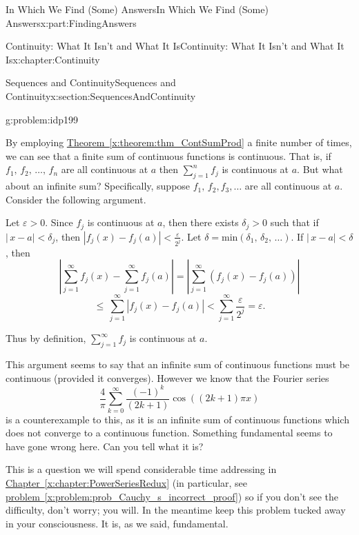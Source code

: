 \documentclass[oneside,10pt,]{book}
\newcommand{\xreffont}{\relax}
\numberwithin{equation}{section}
\newcommand{\eps}{\varepsilon}
\newcommand{\lt}{<}
\begin{document}
\begin{partptx}{In Which We Find (Some) Answers}{}{In Which We Find (Some) Answers}{}{}{x:part:FindingAnswers}
\begin{chapterptx}{Continuity: What It Isn't and What It Is}{}{Continuity: What It Isn't and What It Is}{}{}{x:chapter:Continuity}
\begin{sectionptx}{Sequences and Continuity}{}{Sequences and Continuity}{}{}{x:section:SequencesAndContinuity}
\begin{problem}{}{g:problem:idp199}
\end{problem}
By employing \hyperref[x:theorem:thm_ContSumProd]{Theorem~{\xreffont\ref{x:theorem:thm_ContSumProd}}} a finite number of times, we can see that a finite sum of continuous functions is continuous. That is, if \(f_1,\,f_2,\,\ldots,\,f_n\) are all continuous at \(a\) then \(\sum_{j=1}^nf_j\) is continuous at \(a\). But what about an infinite sum? Specifically, suppose \(f_1,\,f_2,f_3,\ldots\) are all continuous at \(a\). Consider the following argument.%
\par
Let \(\eps>0\). Since \(f_j\) is continuous at \(a\), then there exists \(\delta_j>0\) such that if \(|\,x-a|\lt \delta_j\), then \(|f_j(x)-f_j(a)|\lt \frac{\eps}{2^j}\). Let \(\delta=\)min\(\left(\delta_1,\,\delta_2,\,\ldots\right)\). If \(|\,x-a|\lt \delta\), then%
\begin{equation*}
\left|\sum_{j=1}^\infty f_j(x)-\sum_{j=1}^\infty f_j(a)\right|=\left|\sum_{j=1}^\infty\left(f_j(x)-f_j(a)\right)\right|
\end{equation*}
%
\begin{equation*}
\leq\,\sum_{j=1}^\infty|f_j(x)-f_j(a)|\lt \sum_{j=1}^\infty\frac{ \eps}{2^j}=\eps\text{.}
\end{equation*}
%
\par
Thus by definition, \(\sum_{j=1}^\infty f_j\) is continuous at \(a\).%
\par
This argument seems to say that an infinite sum of continuous functions must be continuous (provided it converges). However we know that the Fourier series%
\begin{equation*}
\frac{4}{\pi}\sum_{k=0}^\infty\frac{\left(-1\right)^k}{\left(2k+1\right)}\cos\left(\left(2k+1\right)\pi x\right)
\end{equation*}
is a counterexample to this, as it is an infinite sum of continuous functions which does not converge to a continuous function. Something fundamental seems to have gone wrong here. Can you tell what it is?%
\par
This is a question we will spend considerable time addressing in \hyperref[x:chapter:PowerSeriesRedux]{Chapter~{\xreffont\ref{x:chapter:PowerSeriesRedux}}} (in particular, see \hyperref[x:problem:prob_Cauchy_s_incorrect_proof]{problem~{\xreffont\ref{x:problem:prob_Cauchy_s_incorrect_proof}}}) so if you don't see the difficulty, don't worry; you will. In the meantime keep this problem tucked away in your consciousness. It is, as we said, fundamental.%
\par

\end{sectionptx}
\end{chapterptx}
\end{partptx}
\end{document}
